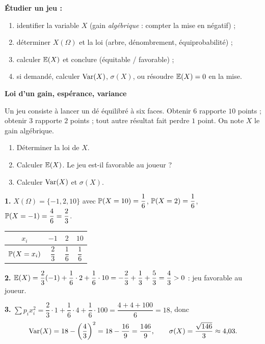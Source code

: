 \begin{methode}
	\textbf{Étudier un jeu :}
	\begin{enumerate}
		\item identifier la variable $X$ (gain \emph{algébrique} : compter la
		mise en négatif) ;
		\item déterminer $X(\Omega)$ et la loi (arbre, dénombrement,
		équiprobabilité) ;
		\item calculer $\mathbb{E}(X)$ et conclure (équitable / favorable) ;
		\item si demandé, calculer $\mathrm{Var}(X)$, $\sigma(X)$, ou résoudre
		$\mathbb{E}(X)=0$ en la mise.
	\end{enumerate}
\end{methode}

\exerciceresolu
\textbf{Loi d'un gain, espérance, variance}

Un jeu consiste à lancer un dé équilibré à six faces. Obtenir $6$ rapporte
$10$ points ; obtenir $3$ rapporte $2$ points ; tout autre résultat fait
perdre $1$ point. On note $X$ le gain algébrique.
\begin{enumerate}
	\item Déterminer la loi de $X$.
	\item Calculer $\mathbb{E}(X)$. Le jeu est-il favorable au joueur ?
	\item Calculer $\mathrm{Var}(X)$ et $\sigma(X)$.
\end{enumerate}

\solution

\textbf{1.} $X(\Omega) = \{-1,2,10\}$ avec $\mathbb{P}(X=10)=\dfrac16$,
$\mathbb{P}(X=2)=\dfrac16$, $\mathbb{P}(X=-1)=\dfrac46=\dfrac23$.
\begin{center}
	\begin{tabular}{|c|c|c|c|}
		\hline
		$x_i$ & $-1$ & $2$ & $10$ \\
		\hline
		$\mathbb{P}(X=x_i)$ & $\dfrac23$ & $\dfrac16$ & $\dfrac16$ \\
		\hline
	\end{tabular}
\end{center}

\textbf{2.} $\mathbb{E}(X) = \dfrac23(-1) + \dfrac16\cdot2 + \dfrac16\cdot10
= -\dfrac23+\dfrac13+\dfrac53 = \dfrac43 > 0$ : jeu favorable au joueur.

\textbf{3.} $\displaystyle\sum p_i x_i^2 = \dfrac23\cdot1 + \dfrac16\cdot4 +
\dfrac16\cdot100 = \dfrac{4+4+100}{6} = 18$, donc
\[
\mathrm{Var}(X) = 18 - \left(\frac43\right)^2 = 18-\frac{16}{9} = \frac{146}{9},
\qquad \sigma(X) = \frac{\sqrt{146}}{3}\approx 4{,}03.
\]

